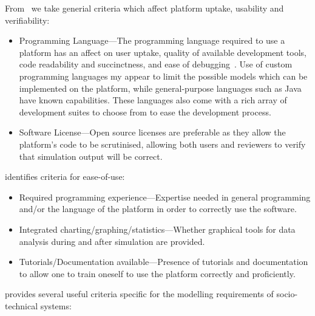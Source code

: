 From~\citet{CynthiaNikolaiandGregoryMadey2009} we take generial criteria which affect platform uptake, usability and verifiability:

\begin{itemize}
\item Programming Language---The programming language required to use a platform has an affect on user uptake, quality of available development tools, code readability and succinctness, and ease of debugging~\citep{Railsback2006}. Use of custom programming languages my appear to limit the possible models which can be implemented on the platform, while general-purpose languages such as Java have known capabilities. These languages also come with a rich array of development suites to choose from to ease the development process.
\item Software License---Open source licenses are preferable as they allow the platform's code to be scrutinised, allowing both users and reviewers to verify that simulation output will be correct.
\end{itemize}

\citet{Castle2006} identifies criteria for ease-of-use:

\begin{itemize}
\item Required programming experience---Expertise needed in general programming and/or the language of the platform in order to correctly use the software.
\item Integrated charting/graphing/statistics---Whether graphical tools for data analysis during and after simulation are provided.
\item Tutorials/Documentation available---Presence of tutorials and documentation to allow one to train oneself to use the platform correctly and proficiently.
\end{itemize}

\citet{Tobias2004} provides several useful criteria specific for the modelling requirements of socio-technical systems:

